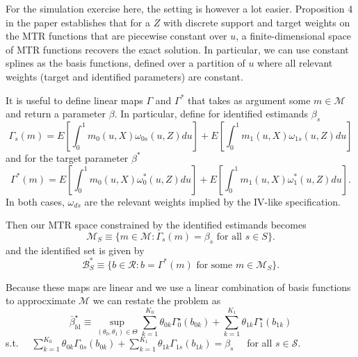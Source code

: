 \documentclass{article}
\begin{document}
For the simulation exercise here, the setting is however a lot easier. Proposition 4 in the paper establishes that for a $Z$ with discrete support and target weights on the MTR functions that are piecewise constant over $u$, a finite-dimensional space of MTR functions recovers the exact solution.
In particular, we can use constant splines as the basis functions, defined over a partition of $u$ where all relevant weights (target and identified parameters) are constant.

It is useful to define linear maps $\Gamma$ and $\Gamma^*$ that takes as argument some $m\in\mathcal{M}$ and return a parameter $\beta$.
In particular, define for identified estimands $\beta_s$
\begin{equation}
    \Gamma_s(m) = E\left[\int_0^1 m_0(u,X)\omega_{0s}(u,Z)du\right]
    + E\left[\int_0^1 m_1(u,X)\omega_{1s}(u,Z)du\right]
\end{equation}
and for the target parameter $\beta^*$
\begin{equation}
    \Gamma^*(m) = E\left[\int_0^1 m_0(u,X)\omega^*_{0}(u,Z)du\right]
    + E\left[\int_0^1 m_1(u,X)\omega^*_{1}(u,Z)du\right].
\end{equation}
In both cases, $\omega_{ds}$ are the relevant weights implied by the IV-like specification.

Then our MTR space constrained by the identified estimands becomes  
\begin{equation}
    \mathcal{M}_S \equiv \{m\in \mathcal{M}: \Gamma_s(m) = \beta_s \text{ for all } s\in S\}.
\end{equation}   
and the identified set is given by
\begin{equation}
    \mathcal{B}^*_S \equiv \{b \in \mathcal{R}: b = \Gamma^*(m) \text{ for some } m \in \mathcal{M}_S\}.
\end{equation}

Because these maps are linear and we use a linear combination of basis functions to approcximate $\mathcal{M}$ we can restate the problem as
$$
\bar{\beta}_{\mathrm{fd}}^{\star} \equiv \sup _{\left(\theta_0, \theta_1\right) \in \Theta} \sum_{k=1}^{K_0} \theta_{0 k} \Gamma_0^{\star}\left(b_{0 k}\right)+\sum_{k=1}^{K_1} \theta_{1 k} \Gamma_1^{\star}\left(b_{1 k}\right)
$$
s.t. $\quad \sum_{k=1}^{K_0} \theta_{0 k} \Gamma_{0 s}\left(b_{0 k}\right)+\sum_{k=1}^{K_1} \theta_{1 k} \Gamma_{1 s}\left(b_{1 k}\right)=\beta_s \quad$ for all $s \in \mathcal{S}$.
\end{document}
